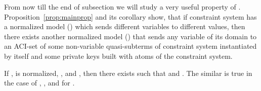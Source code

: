 From now till the end of subsection we will study a very useful property of .
Proposition~\ref{prop:mainprop} and its corollary show, 
that if constraint system has a normalized model () which sends different variables to different values, 
then there exists another normalized model ()  that  sends any variable of its domain
to an ACI-set of some non-variable quasi-subterms of constraint system instantiated by itself
and some private keys built with atoms of  the constraint system.

\begin{lemma}\label{lemma:goodSub}
	If ,  is normalized, ,   and ,
	then there exists  such that  and . 
	The similar is true in the case of  , ,  and for .
\end{lemma}



